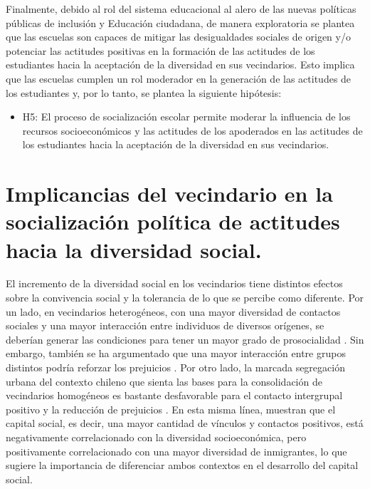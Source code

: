 \documentclass[12pt,twoside]{templates/facsothesis}
\providecommand{\tightlist}{%
  \setlength{\itemsep}{0pt}\setlength{\parskip}{0pt}}
\begin{document}
Finalmente, debido al rol del sistema educacional al alero de las nuevas políticas públicas de inclusión y Educación ciudadana, de manera exploratoria se plantea que las escuelas son capaces de mitigar las desigualdades sociales de origen y/o potenciar las actitudes positivas en la formación de las actitudes de los estudiantes hacia la aceptación de la diversidad en sus vecindarios. Esto implica que las escuelas cumplen un rol moderador en la generación de las actitudes de los estudiantes y, por lo tanto, se plantea la siguiente hipótesis:

\begin{itemize}
\tightlist
\item
  H5: El proceso de socialización escolar permite moderar la influencia de los recursos socioeconómicos y las actitudes de los apoderados en las actitudes de los estudiantes hacia la aceptación de la diversidad en sus vecindarios.
\end{itemize}

\hypertarget{implicancias-del-vecindario-en-la-socializaciuxf3n-poluxedtica-de-actitudes-hacia-la-diversidad-social.}{%
\section{Implicancias del vecindario en la socialización política de actitudes hacia la diversidad social.}\label{implicancias-del-vecindario-en-la-socializaciuxf3n-poluxedtica-de-actitudes-hacia-la-diversidad-social.}}

El incremento de la diversidad social en los vecindarios tiene distintos efectos sobre la convivencia social y la tolerancia de lo que se percibe como diferente. Por un lado, en vecindarios heterogéneos, con una mayor diversidad de contactos sociales y una mayor interacción entre individuos de diversos orígenes, se deberían generar las condiciones para tener un mayor grado de prosocialidad \citep{diprete_segregation_2011}. Sin embargo, también se ha argumentado que una mayor interacción entre grupos distintos podría reforzar los prejuicios \citep{putnam_pluribus_2007}. Por otro lado, la marcada segregación urbana del contexto chileno que sienta las bases para la consolidación de vecindarios homogéneos es bastante desfavorable para el contacto intergrupal positivo y la reducción de prejuicios \citep{garreton_city_2017}. En esta misma línea, \citet{garreton_social_2021} muestran que el capital social, es decir, una mayor cantidad de vínculos y contactos positivos, está negativamente correlacionado con la diversidad socioeconómica, pero positivamente correlacionado con una mayor diversidad de inmigrantes, lo que sugiere la importancia de diferenciar ambos contextos en el desarrollo del capital social.
\end{document}
